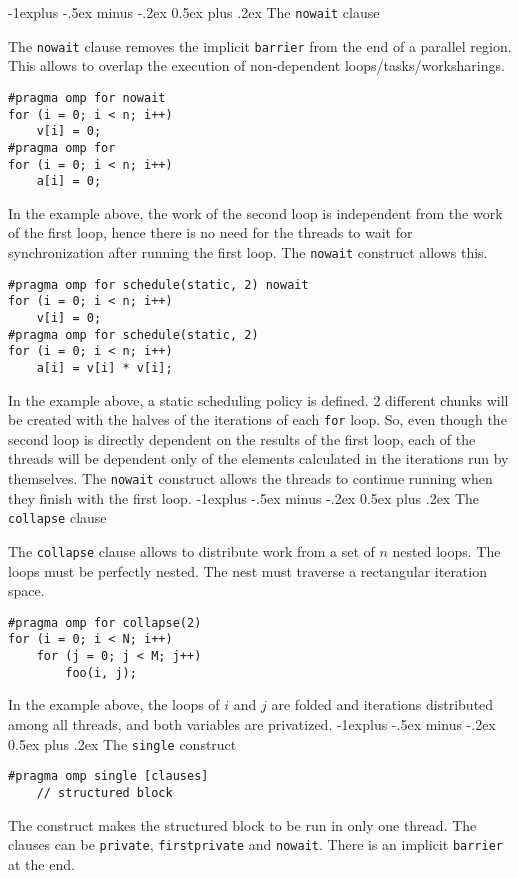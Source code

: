 \documentclass[10pt,landscape]{article}
\makeatletter
\renewcommand{\subsection}{\@startsection{subsection}{2}{0mm}%
                                {-1explus -.5ex minus -.2ex}%
                                {0.5ex plus .2ex}%
                                {\normalfont\normalsize\bfseries}}
\makeatother
\begin{document}
\begin{multicols}{3}
\subsection{The \texttt{nowait} clause}
\par
The \texttt{nowait} clause removes the implicit \texttt{barrier} from the end of a parallel region. This allows to overlap the execution of non-dependent loops/tasks/worksharings.
\begin{verbatim}
#pragma omp for nowait
for (i = 0; i < n; i++)
    v[i] = 0;
#pragma omp for
for (i = 0; i < n; i++)
    a[i] = 0;
\end{verbatim}
\par
In the example above, the work of the second loop is independent from the work of the first loop, hence there is no need for the threads to wait for synchronization after running the first loop. The \texttt{nowait} construct allows this.
\begin{verbatim}
#pragma omp for schedule(static, 2) nowait
for (i = 0; i < n; i++)
    v[i] = 0;
#pragma omp for schedule(static, 2)
for (i = 0; i < n; i++)
    a[i] = v[i] * v[i];
\end{verbatim}
\par
In the example above, a static scheduling policy is defined. 2 different chunks will be created with the halves of the iterations of each \texttt{for} loop. So, even though the second loop is directly dependent on the results of the first loop, each of the threads will be dependent only of the elements calculated in the iterations run by themselves. The \texttt{nowait} construct allows the threads to continue running when they finish with the first loop.
\subsection{The \texttt{collapse} clause}
\par
The \texttt{collapse} clause allows to distribute work from a set of $n$ nested loops. The loops must be perfectly nested. The nest must traverse a rectangular iteration space.
\begin{verbatim}
#pragma omp for collapse(2)
for (i = 0; i < N; i++) 
    for (j = 0; j < M; j++)
        foo(i, j);
\end{verbatim}
\par
In the example above, the loops of $i$ and $j$ are folded and iterations distributed among all threads, and both variables are privatized.
\subsection{The \texttt{single} construct}
\begin{verbatim}
#pragma omp single [clauses]
    // structured block
\end{verbatim}
\par
The construct makes the structured block to be run in only one thread. The clauses can be \texttt{private}, \texttt{firstprivate} and \texttt{nowait}. There is an implicit \texttt{barrier} at the end.

\end{multicols}
\end{document}
